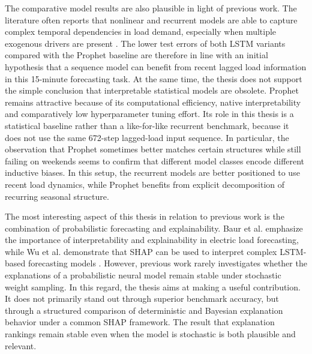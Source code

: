 \documentclass[Master,english,IEEE]{twbook}
\begin{document}
The comparative model results are also plausible in light of previous work. The literature often reports that nonlinear and recurrent models are able to capture complex temporal dependencies in load demand, especially when multiple exogenous drivers are present \cite{andriopoulosShortTermElectric2021,liPowerLoadForecasting2022}. The lower test errors of both LSTM variants compared with the Prophet baseline are therefore in line with an initial hypothesis that a sequence model can benefit from recent lagged load information in this 15-minute forecasting task. At the same time, the thesis does not support the simple conclusion that interpretable statistical models are obsolete. Prophet remains attractive because of its computational efficiency, native interpretability and comparatively low hyperparameter tuning effort. Its role in this thesis is a statistical baseline rather than a like-for-like recurrent benchmark, because it does not use the same 672-step lagged-load input sequence. In particular, the observation that Prophet sometimes better matches certain structures while still failing on weekends seems to confirm that different model classes encode different inductive biases. In this setup, the recurrent models are better positioned to use recent load dynamics, while Prophet benefits from explicit decomposition of recurring seasonal structure.

The most interesting aspect of this thesis in relation to previous work is the combination of probabilistic forecasting and explainability. Baur et al. emphasize the importance of interpretability and explainability in electric load forecasting, while Wu et al. demonstrate that SHAP can be used to interpret complex LSTM-based forecasting models \cite{baurExplainabilityInterpretabilityElectric2024, wuExplainableFrameworkLoad2022}.
However, previous work rarely investigates whether the explanations of a probabilistic neural model remain stable under stochastic weight sampling. In this regard, the thesis aims at making a useful contribution. It does not primarily stand out through superior benchmark accuracy, but through a structured comparison of deterministic and Bayesian explanation behavior under a common SHAP framework. The result that explanation rankings remain stable even when the model is stochastic is both plausible and relevant.
\end{document}
